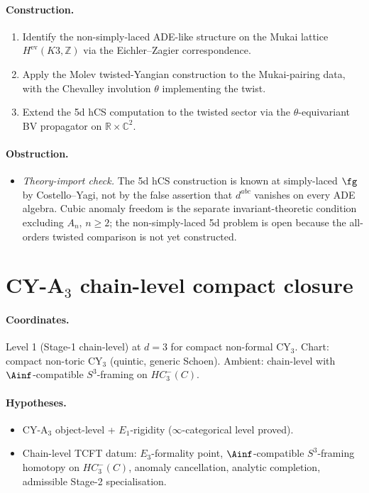 \paragraph{Construction.}
\begin{enumerate}[nosep]
\item Identify the non-simply-laced ADE-like structure on the Mukai
  lattice $H^{\mathrm{ev}}(K3, \mathbb{Z})$ via the
  Eichler--Zagier correspondence.
\item Apply the Molev twisted-Yangian construction to the Mukai-pairing
  data, with the Chevalley involution $\theta$ implementing the twist.
\item Extend the 5d hCS computation to the twisted sector via the
  $\theta$-equivariant BV propagator on
  $\mathbb{R} \times \mathbb{C}^2$.
\end{enumerate}

\paragraph{Obstruction.}
\begin{itemize}[nosep]
\item \emph{Theory-import check.} The 5d hCS construction is
  known at simply-laced $\fg$ by Costello--Yagi, not by the false
  assertion that $d^{abc}$ vanishes on every ADE algebra. Cubic
  anomaly freedom is the separate invariant-theoretic condition
  excluding $A_n$, $n \geq 2$; the non-simply-laced 5d problem is open
  because the all-orders twisted comparison is not yet constructed.
\end{itemize}

\section{CY-A$_3$ chain-level compact closure}
\label{sec:open-cya3-chain}

\paragraph{Coordinates.} Level 1 (Stage-1 chain-level) at $d = 3$ for
compact non-formal CY$_3$. Chart: compact non-toric CY$_3$ (quintic,
generic Schoen). Ambient: chain-level with $\Ainf$-compatible
$S^3$-framing on $HC^-_3(C)$.

\paragraph{Hypotheses.}
\begin{itemize}[nosep]
\item CY-A$_3$ object-level + $E_1$-rigidity
  ($\infty$-categorical level proved).
\item Chain-level TCFT datum: $E_3$-formality point,
  $\Ainf$-compatible $S^3$-framing homotopy on $HC^-_3(C)$, anomaly
  cancellation, analytic completion, admissible Stage-2
  specialisation.
\end{itemize}

